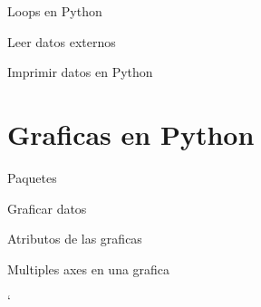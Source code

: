 \documentclass[
10pt,
aspectratio=169,
]{beamer}
\begin{document}
\begin{frame}[c]{Loops en Python}
\end{frame}

\begin{frame}[c]{Leer datos externos}
\end{frame}

\begin{frame}[c]{Imprimir datos en Python}
\end{frame}

\section{Graficas en Python}
\begin{frame}[c]{Paquetes}
\end{frame}

\begin{frame}[c]{Graficar datos}
\end{frame}

\begin{frame}[c]{Atributos de las graficas}
\end{frame}

\begin{frame}[c]{Multiples axes en una grafica}
\end{frame}




`
\end{document}
